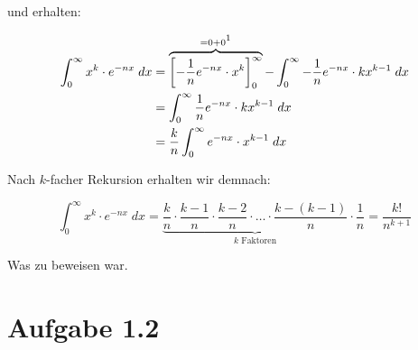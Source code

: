 \documentclass[a4paper,german,12pt,smallheadings]{scrartcl}
\begin{document}
und erhalten:

\begin{align*}
  \int_0^\infty x^k \cdot e^{-nx} \; dx  &= \overbrace{\left[-\frac{1}{n} e^{-nx} \cdot x^k\right]_0^\infty}^{=0+0\footnotemark[1]} - \int_0^\infty -\frac{1}{n}e^{-nx} \cdot kx^{k-1} \; dx \\
                                         &= \int_0^\infty \frac{1}{n}e^{-nx} \cdot kx^{k-1} \; dx \\
                                         &= \frac{k}{n} \int_0^\infty e^{-nx} \cdot x^{k-1} \; dx
\end{align*}


Nach $k$-facher Rekursion erhalten wir demnach:

\begin{equation*}
  \int_0^\infty x^k \cdot e^{-nx} \; dx = \underbrace{\frac{k}{n} \cdot \frac{k-1}{n} \cdot \frac{k-2}{n} \cdot \dots \cdot \frac{k-(k-1)}{n}}_{k\text{ Faktoren}} \cdot \frac{1}{n} = \frac{k!}{n^{k+1}}
\end{equation*}

Was zu beweisen war.


\section*{Aufgabe 1.2}
\end{document}
